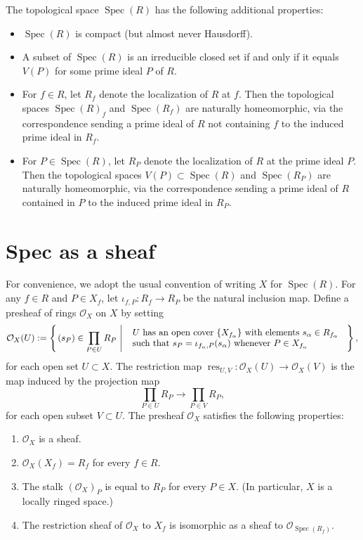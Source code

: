 \documentclass[12pt]{article}
\renewcommand{\O}{\mathcal{O}}
\newcommand{\lra}{\longrightarrow}
\newcommand{\res}{\operatorname{res}}
\newcommand{\Spec}{\operatorname{Spec}}
\begin{document}
The topological space $\Spec(R)$ has the following additional
properties:
\begin{itemize}
\item $\Spec(R)$ is compact (but almost never Hausdorff).
\item A subset of $\Spec(R)$ is an irreducible closed set if and only if it equals $V(P)$ for some prime ideal $P$ of $R$.
\item For $f \in R$, let $R_f$ denote the localization of $R$ at
$f$. Then the topological spaces $\Spec(R)_f$ and $\Spec(R_f)$ are
naturally homeomorphic, via the correspondence sending a prime ideal
of $R$ not containing $f$ to the induced prime ideal in $R_f$.
\item For $P \in \Spec(R)$, let $R_P$ denote the localization of $R$
at the prime ideal $P$. Then the topological spaces $V(P) \subset
\Spec(R)$ and $\Spec(R_P)$ are naturally homeomorphic, via the
correspondence sending a prime ideal of $R$ contained in $P$ to the
induced prime ideal in $R_P$.
\end{itemize}

\section{Spec as a sheaf}

For convenience, we adopt the usual convention of writing $X$ for
$\Spec(R)$. For any $f \in R$ and $P \in X_f$, let $\iota_{f,P}: R_f
\lra R_P$ be the natural inclusion map. Define a presheaf of rings
$\O_X$ on $X$ by setting
$$
\O_X(U) := \left\{ \left.(s_P) \in \prod_{P \in U} R_P \ \right|
\mbox{
\begin{tabular}{l}
$U$ has an open cover $\{ X_{f_\alpha} \}$ with elements
$s_\alpha \in R_{f_\alpha}$ \\
such that $s_P = \iota_{f_\alpha,P}(s_\alpha)$
whenever $P \in X_{f_\alpha}$
\end{tabular}
}
\right\},
$$
for each open set $U \subset X$. The restriction map $\res_{U,V}:
\O_X(U) \lra \O_X(V)$ is the map induced by the projection map
$$
\prod_{P \in U} R_P \lra \prod_{P \in V} R_P,
$$
for each open subset $V \subset U$. The presheaf $\O_X$ satisfies the
following properties:
\begin{enumerate}
\item $\O_X$ is a sheaf.
\item $\O_X(X_f) = R_f$ for every $f \in R$.
\item The stalk $(\O_X)_P$ is equal to $R_P$ for every $P \in X$. (In particular, $X$ is a locally ringed space.)
\item The restriction sheaf of $\O_X$ to $X_f$ is isomorphic as a
sheaf to $\O_{\Spec(R_f)}$.
\end{enumerate}
\end{document}
